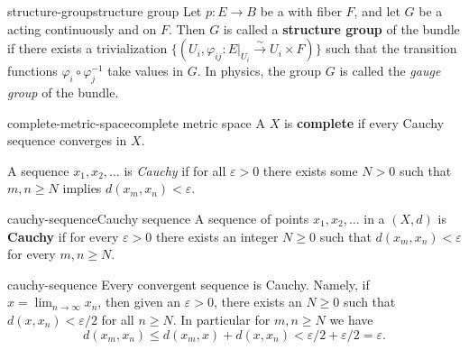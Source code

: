 \begin{topic}{structure-group}{structure group}
    Let $p : E \to B$ be a  with fiber $F$, and let $G$ be a  acting continuously and  on $F$. Then $G$ is called a \textbf{structure group} of the bundle if there exists a trivialization $\{ (U_i, \varphi_{ij} : E|_{U_i} \xrightarrow{\sim} U_i \times F) \}$ such that the transition functions $\varphi_i \circ \varphi_j^{-1}$ take values in $G$. In physics, the group $G$ is called the \textit{gauge group} of the bundle.
\end{topic}


\begin{topic}{complete-metric-space}{complete metric space}
    A  $X$ is \textbf{complete} if every Cauchy sequence converges in $X$.
    
    A sequence $x_1, x_2, \ldots$ is \textit{Cauchy} if for all $\varepsilon > 0$ there exists some $N > 0$ such that $m, n \ge N$ implies $d(x_m, x_n) < \varepsilon$.
\end{topic}

\begin{topic}{cauchy-sequence}{Cauchy sequence}
    A sequence of points $x_1, x_2, \ldots$ in a  $(X, d)$ is \textbf{Cauchy} if for every $\varepsilon > 0$ there exists an integer $N \ge 0$ such that $d(x_m, x_n) < \varepsilon$ for every $m, n \ge N$.
\end{topic}

\begin{example}{cauchy-sequence}
    Every convergent sequence is Cauchy. Namely, if $x = \lim_{n \to \infty} x_n$, then given an $\varepsilon > 0$, there exists an $N \ge 0$ such that $d(x, x_n) < \varepsilon / 2$ for all $n \ge N$. In particular for $m, n \ge N$ we have
    \[ d(x_m, x_n) \le d(x_m, x) + d(x, x_n) < \varepsilon/2 + \varepsilon/2 = \varepsilon . \]
\end{example}

